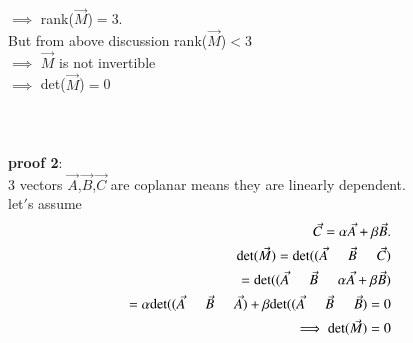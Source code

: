 \documentclass[journal]{IEEEtran}
\begin{document}
$\implies$ rank($\Vec{M}$)$=$3.\\ 
But from above discussion  rank($\Vec{M}$)$<$3 \\
$\implies$ $\Vec{M}$ is not invertible\\
$\implies$ det($\Vec{M}$)$=$0\\ \\ \\  \\
\textbf{proof 2}:\\
 3 vectors $\Vec{A}$,$\Vec{B}$,$\Vec{C}$ are coplanar means they are linearly dependent.\\
 let$'$s assume
 \begin{align}
     \Vec{C}=\alpha \Vec{A}+\beta \Vec{B}.\\
     \text{det}(\Vec{M})=\text{det}((\Vec{A} \hspace{0.5cm} \Vec{B} \hspace{0.5cm} \Vec{C})\\
 =\text{det}((\Vec{A} \hspace{0.5cm} \Vec{B} \hspace{0.5cm} \alpha \Vec{A}+\beta \Vec{B})\\
 =\alpha \text{det}((\Vec{A} \hspace{0.5cm} \Vec{B} \hspace{0.5cm} \Vec{A}) + \beta \text{det}((\Vec{A} \hspace{0.5cm} \Vec{B} \hspace{0.5cm} \Vec{B})=0\\
 \implies \text{det}(\Vec{M})=0
 \end{align}
\end{document}
